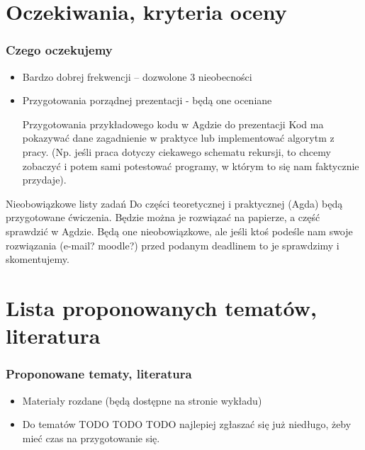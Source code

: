 \documentclass{beamer}
\begin{document}

\section{Oczekiwania, kryteria oceny}

\begin{frame}

\frametitle{Czego oczekujemy}

\begin{itemize}
\item Bardzo dobrej frekwencji -- dozwolone 3 nieobecności \pause

\item Przygotowania porządnej prezentacji - będą one oceniane \pause

\begin{block}{Przygotowania przykładowego kodu w Agdzie do prezentacji}
  Kod ma pokazywać dane zagadnienie w praktyce lub implementować algorytm z pracy.
  (Np. jeśli praca dotyczy ciekawego schematu rekursji, to chcemy zobaczyć i potem sami potestować programy, w którym to się nam faktycznie przydaje).
\end{block}

\pause

\end{itemize}

\begin{block}{Nieobowiązkowe listy zadań}
  Do części teoretycznej i praktycznej (Agda) będą przygotowane ćwiczenia.
  Będzie można je rozwiązać na papierze, a część sprawdzić w Agdzie. 
  Będą one nieobowiązkowe, ale jeśli ktoś podeśle nam swoje
  rozwiązania (e-mail? moodle?) przed podanym deadlinem to je sprawdzimy i skomentujemy.
\end{block}


\end{frame}

\section{Lista proponowanych tematów, literatura}

\begin{frame}

\frametitle{Proponowane tematy, literatura}

\begin{itemize}

\item Materiały rozdane (będą dostępne na stronie wykładu) \pause
\item Do tematów TODO TODO TODO najlepiej zgłaszać się już niedługo, 
żeby mieć czas na przygotowanie się.

\end{itemize}

\end{frame}
\end{document}
